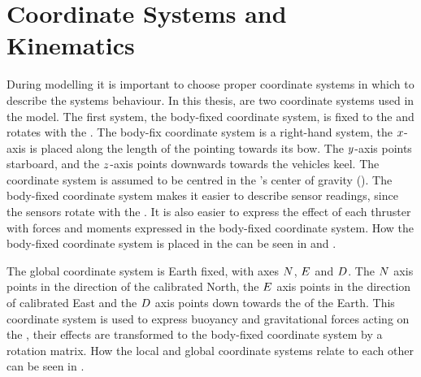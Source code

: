 \section{Coordinate Systems and Kinematics}
\label{sec:coordinates}
During modelling it is important to choose proper coordinate systems in which to describe the systems behaviour.
In this thesis, are two coordinate systems used in the \abbrROV model.
The first system, the body-fixed coordinate system, is fixed to the \abbrROV and rotates with the \abbrROV. 
The body-fix coordinate system is a right-hand system, the $x$-axis is placed along the length of the \abbrROV pointing towards its bow. The $y$-axis points starboard, and the $z$-axis points downwards towards the vehicles keel. The coordinate system is assumed to be centred in the \abbrROV's  center of gravity (\abbrCG). The body-fixed coordinate system makes it easier to describe sensor readings, since the sensors rotate with the \abbrROV. It is also easier to express the effect of each thruster with forces and moments expressed in the body-fixed coordinate system. How the body-fixed coordinate system is placed in the \abbrROV can be seen in  and .

The global coordinate system is Earth fixed, with axes $N$, $E$ and $D$. The $N$ axis points in the direction of the calibrated North, the $E$ axis points in the direction of calibrated East and the $D$ axis points down towards the \abbrCG of the Earth.
This coordinate system is used to express buoyancy and gravitational forces acting on the \abbrROV, their effects are transformed to the body-fixed coordinate system by a rotation matrix. How the local and global coordinate systems relate to each other can be seen in .

